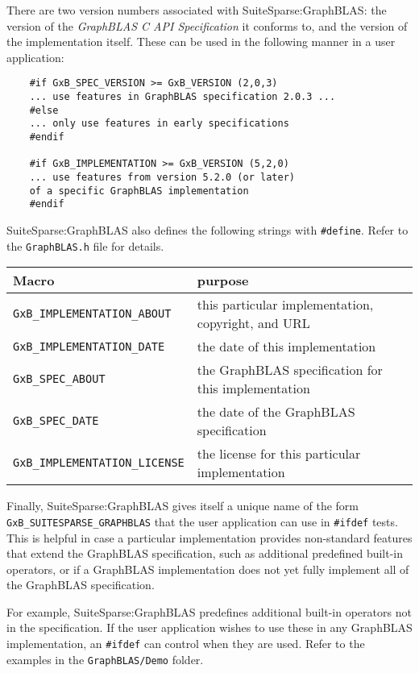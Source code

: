 \documentclass[12pt]{article}
\begin{document}
There are two version numbers associated with SuiteSparse:GraphBLAS:
the version of the {\em GraphBLAS C API Specification} it
conforms to, and the version of the implementation itself.  These can
be used in the following manner in a user application:

{\footnotesize
\begin{verbatim}
    #if GxB_SPEC_VERSION >= GxB_VERSION (2,0,3)
    ... use features in GraphBLAS specification 2.0.3 ...
    #else
    ... only use features in early specifications
    #endif

    #if GxB_IMPLEMENTATION >= GxB_VERSION (5,2,0)
    ... use features from version 5.2.0 (or later)
    of a specific GraphBLAS implementation
    #endif \end{verbatim}}

SuiteSparse:GraphBLAS also defines the following strings with \verb'#define'.
Refer to the \verb'GraphBLAS.h' file for details.

\vspace{0.2in}
{\footnotesize
\begin{tabular}{ll}
\hline
Macro                & purpose                                      \\
\hline
\verb'GxB_IMPLEMENTATION_ABOUT'
    & this particular implementation, copyright, and URL \\
\verb'GxB_IMPLEMENTATION_DATE'
    & the date of this implementation \\
\verb'GxB_SPEC_ABOUT'
    & the GraphBLAS specification for this implementation \\
\verb'GxB_SPEC_DATE'
    & the date of the GraphBLAS specification \\
\verb'GxB_IMPLEMENTATION_LICENSE'
    & the license for this particular implementation \\
\hline
\end{tabular}
}
\vspace{0.2in}

Finally, SuiteSparse:GraphBLAS gives itself a unique name of the form
\verb'GxB_SUITESPARSE_GRAPHBLAS' that the user application can use in
\verb'#ifdef' tests. This is helpful in case a particular implementation
provides non-standard features that extend the GraphBLAS specification, such as
additional predefined built-in operators, or if a GraphBLAS implementation does
not yet fully implement all of the GraphBLAS specification.

For example, SuiteSparse:GraphBLAS predefines additional built-in operators not
in the specification.  If the user application wishes to use these in any
GraphBLAS implementation, an \verb'#ifdef' can control when they are used.
Refer to the examples in the \verb'GraphBLAS/Demo' folder.
\end{document}
